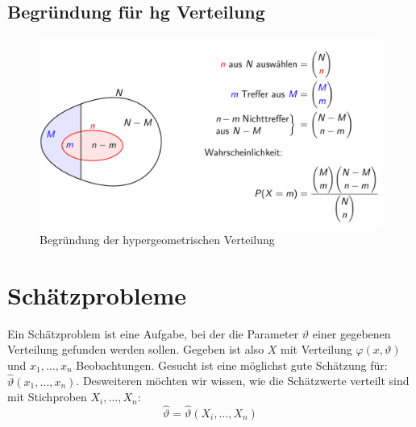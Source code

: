 \documentclass[../Main.tex]{subfiles}
\begin{document}

\subsection{Begründung für hg Verteilung}
    
\begin{figure}[H]
    \centering
    \includegraphics[width=0.75\linewidth]{Images/begr-hg-verteilung.png}
    \caption{Begründung der hypergeometrischen Verteilung}
\end{figure}


\section{Schätzprobleme}
Ein Schätzproblem ist eine Aufgabe, bei der die Parameter \(\vartheta\) einer gegebenen
Verteilung gefunden werden sollen. Gegeben ist also \(X\) mit Verteilung
\(\varphi(x,\vartheta)\) und \(x_1,\dots,x_n\) Beobachtungen.
Gesucht ist eine möglichst gute Schätzung für: \(\hat{\vartheta}(x_1,\dots,x_n)\).
Desweiteren möchten wir wissen, wie die Schätzwerte verteilt sind mit
Stichproben \(X_i,\dots,X_n\):
\begin{equation}
    \hat{\vartheta} = \hat{\vartheta}(X_i,\dots,X_n)
\end{equation}


\end{document}
